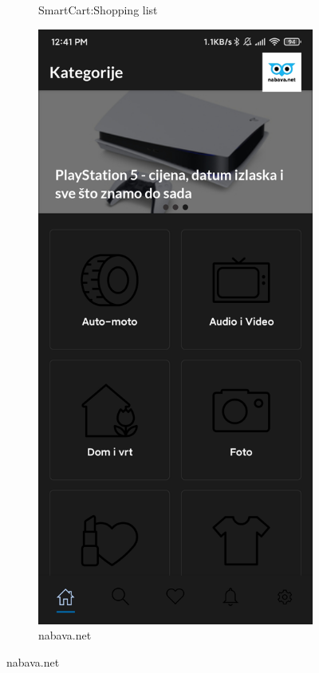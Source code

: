 \begin{figure}
\begin{subfigure}{0.49\textwidth}
            \caption{SmartCart:Shopping list}
            \label{fig:SmartCart: Shopping list}
        \end{subfigure}
        \begin{subfigure}{0.49\textwidth}
            \centering
            \includegraphics[width = \textwidth]{slike/nabava_net.jpg}
            \caption{nabava.net}
            \label{fig:nabava.net}
        \end{subfigure}
    \end{figure}
    
